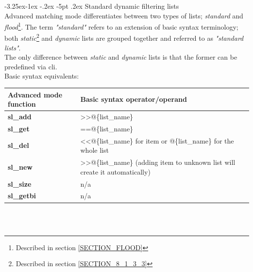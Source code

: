 \documentclass[a4paper,latin]{paper}
\makeatletter
\renewcommand\subparagraph{\@startsection{subparagraph}{5}{\z@}%
                                     {-3.25ex\@plus -1ex \@minus -.2ex}%
                                     {-5pt \@plus .2ex}%
                                     {\normalfont\normalsize\bfseries}}
\makeatother
\begin{document}
\subparagraph{Standard dynamic filtering lists}\label{SECTION_DYN_LISTS}
\mbox{}\\
Advanced matching mode differentiates between two types of lists; \textit{standard} and \textit{flood}\footnote{Described in section \ref{SECTION_FLOOD}}.
The term \textit{"standard"} refers to an extension of basic syntax terminology; both \textit{static}\footnote{Described in section \ref{SECTION_8_1_3_3}} and \textit{dynamic} lists
are grouped together and referred to as \textit{"standard lists"}.\\

The only difference between \textit{static} and \textit{dynamic} lists is that the former can be predefined 
via \acrfull{cli}.\\

\noindent{}Basic syntax equivalents:\\
\begin{tabularx}{\textwidth}{ | l | X | }
	\hline
	Advanced mode function	& Basic syntax operator/operand \\
	\hline
	\textbf{sl\_add}		& \textgreater\textgreater{}@\{list\_name\} \\
	\textbf{sl\_get}		& ==@\{list\_name\} \\
	\textbf{sl\_del}		& \textless\textless{}@\{list\_name\} for item or \textendash\textendash{}@\{list\_name\} for the whole list \\
	\textbf{sl\_new}		& \textgreater\textgreater{}@\{list\_name\} (adding item to unknown list will create it automatically) \\
	\textbf{sl\_size}		& n/a \\
	\textbf{sl\_getbi}		& n/a \\
	\hline
\end{tabularx}\\\\


\clearpage
\end{document}
